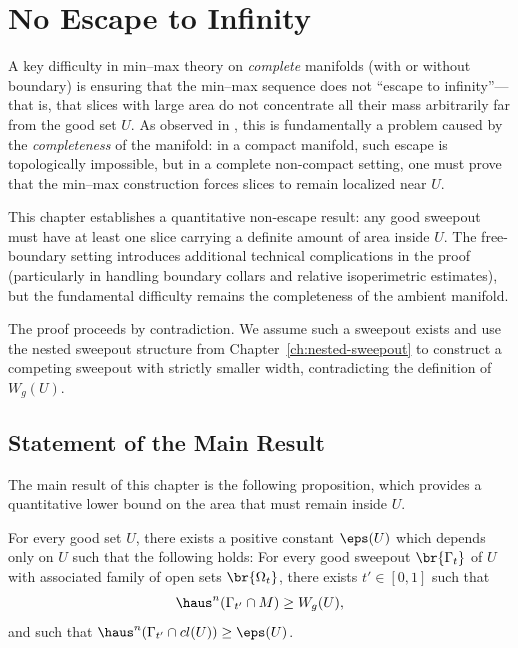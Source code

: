 \chapter{No Escape to Infinity}\label{ch:no-escape-to-infinity}

A key difficulty in min--max theory on \emph{complete} manifolds (with or without boundary) is ensuring that the min--max sequence does not ``escape to infinity''---that is, that slices with large area do not concentrate all their mass arbitrarily far from the good set $U$. As observed in \cite{CL20}, this is fundamentally a problem caused by the \emph{completeness} of the manifold: in a compact manifold, such escape is topologically impossible, but in a complete non-compact setting, one must prove that the min--max construction forces slices to remain localized near $U$.

This chapter establishes a quantitative non-escape result: any good sweepout must have at least one slice carrying a definite amount of area inside $U$. The free-boundary setting introduces additional technical complications in the proof (particularly in handling boundary collars and relative isoperimetric estimates), but the fundamental difficulty remains the completeness of the ambient manifold.

The proof proceeds by contradiction. We assume such a sweepout exists and use the nested sweepout structure from Chapter~\ref{ch:nested-sweepout} to construct a competing sweepout with strictly smaller width, contradicting the definition of $W_g(U)$.

\section{Statement of the Main Result}\label{sec:non-escape-statement}

The main result of this chapter is the following proposition, which provides a quantitative lower
bound on the area that must remain inside $U$.

\begin{proposition}\label{prop:non-escape}
    For every good set $U$, there exists a positive constant $\eps(U)$ which depends only on $U$ such that the following holds: For every good sweepout $\br{\Gamma_t}$ of $U$ with associated family of open sets $\br{\Omega_t}$, there exists $t' \in [0, 1]$ such that
    \begin{equation*}
        \haus^n(\Gamma_{t'}\cap M) \geq W_g(U),
    \end{equation*}
    and such that $\haus^n(\Gamma_{t'}\cap cl(U)) \geq \eps(U)$.
\end{proposition}

